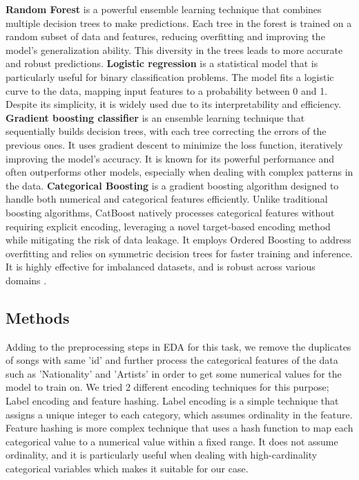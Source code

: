\documentclass{article}
\begin{document}
\textbf{Random Forest} is a powerful ensemble learning technique that combines multiple decision trees to make predictions\cite{Breiman2001}. Each tree in the forest is trained on a random subset of data and features, reducing overfitting and improving the model's generalization ability. This diversity in the trees leads to more accurate and robust predictions. \textbf{Logistic regression} is a statistical model that is particularly useful for binary classification problems\cite{Hosmer2013}. The model fits a logistic curve to the data, mapping input features to a probability between 0 and 1. Despite its simplicity, it is widely used due to its interpretability and efficiency. \textbf{Gradient boosting classifier} is an ensemble learning technique that sequentially builds decision trees, with each tree correcting the errors of the previous ones\cite{Friedman2001}. It uses gradient descent to minimize the loss function, iteratively improving the model's accuracy. It is known for its powerful performance and often outperforms other models, especially when dealing with complex patterns in the data. \textbf{Categorical Boosting} is a gradient boosting algorithm designed to handle both numerical and categorical features efficiently. Unlike traditional boosting algorithms, CatBoost natively processes categorical features without requiring explicit encoding, leveraging a novel target-based encoding method while mitigating the risk of data leakage. It employs Ordered Boosting to address overfitting and relies on symmetric decision trees for faster training and inference. It is highly effective for imbalanced datasets, and is robust across various domains \cite{prokhorenkova2018catboost}.

\subsection{Methods}

Adding to the preprocessing steps in EDA for this task, we remove the duplicates of songs with same 'id' and further process the categorical features of the data such as 'Nationality' and 'Artists' in order to get some numerical values for the model to train on. We tried 2 different encoding techniques for this purpose; Label encoding and feature hashing. Label encoding is a simple technique that assigns a unique integer to each category, which assumes ordinality in the feature. Feature hashing is more complex technique that uses a hash function to map each categorical value to a numerical value within a fixed range. It does not assume ordinality, and it is particularly useful when dealing with high-cardinality categorical variables\cite{weinberger2009feature} which makes it suitable for our case.
\end{document}
